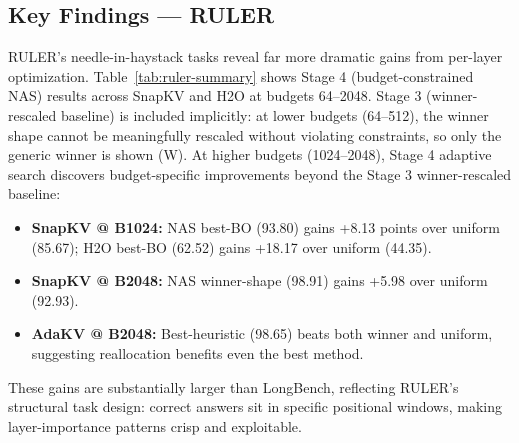 \documentclass[11pt]{article}
\begin{document}
\subsection{Key Findings — RULER}

RULER's needle-in-haystack tasks reveal far more dramatic gains from per-layer optimization. Table~\ref{tab:ruler-summary} shows Stage 4 (budget-constrained NAS) results across SnapKV and H2O at budgets 64–2048. Stage 3 (winner-rescaled baseline) is included implicitly: at lower budgets (64–512), the winner shape cannot be meaningfully rescaled without violating constraints, so only the generic winner is shown (W). At higher budgets (1024–2048), Stage 4 adaptive search discovers budget-specific improvements beyond the Stage 3 winner-rescaled baseline:

\begin{itemize}
\item \textbf{SnapKV @ B1024:} NAS best-BO (93.80) gains +8.13 points over uniform (85.67); H2O best-BO (62.52) gains +18.17 over uniform (44.35).
\item \textbf{SnapKV @ B2048:} NAS winner-shape (98.91) gains +5.98 over uniform (92.93).
\item \textbf{AdaKV @ B2048:} Best-heuristic (98.65) beats both winner and uniform, suggesting reallocation benefits even the best method.
\end{itemize}

These gains are substantially larger than LongBench, reflecting RULER's structural task design: correct answers sit in specific positional windows, making layer-importance patterns crisp and exploitable.
\end{document}
